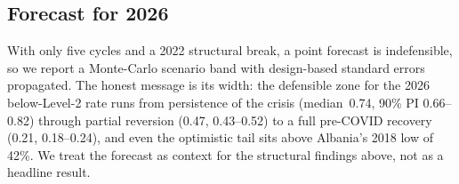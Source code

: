\subsection{Forecast for 2026}
With only five cycles and a 2022 structural break, a point forecast is indefensible, so
we report a Monte-Carlo scenario band with design-based standard errors propagated. The
honest message is its width: the defensible zone for the 2026 below-Level-2 rate runs
from persistence of the crisis (median~0.74, 90\% PI 0.66--0.82) through partial
reversion (0.47, 0.43--0.52) to a full pre-COVID recovery (0.21, 0.18--0.24), and even
the optimistic tail sits above Albania's 2018 low of 42\%. We treat the forecast as
context for the structural findings above, not as a headline result.
